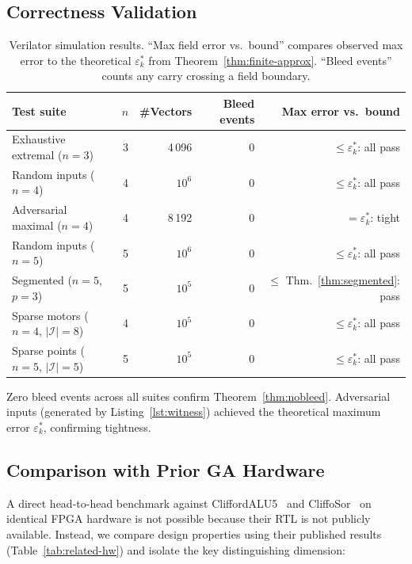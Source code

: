 \documentclass[11pt,a4paper]{article}
\theoremstyle{definition}
\theoremstyle{plain}
\theoremstyle{remark}
\begin{document}
\subsection{Correctness Validation}

\begin{table}[h]
\centering
\caption{Verilator simulation results.
``Max field error vs.\ bound'' compares observed max error to the
theoretical $\varepsilon_k^*$ from Theorem~\ref{thm:finite-approx}.
``Bleed events'' counts any carry crossing a field boundary.}
\label{tab:correctness}
\begin{tabular}{lrrrr}
\toprule
Test suite & $n$ & \#Vectors & Bleed events & Max error vs.\ bound \\
\midrule
Exhaustive extremal ($n=3$) & 3 & 4\,096 & 0 & $\le\varepsilon_k^*$: all pass \\
Random inputs ($n=4$) & 4 & $10^6$ & 0 & $\le\varepsilon_k^*$: all pass \\
Adversarial maximal ($n=4$) & 4 & 8\,192 & 0 & $=\varepsilon_k^*$: tight \\
Random inputs ($n=5$) & 5 & $10^6$ & 0 & $\le\varepsilon_k^*$: all pass \\
Segmented ($n=5$, $p=3$) & 5 & $10^5$ & 0 & $\le$ Thm.~\ref{thm:segmented}: pass \\
Sparse motors ($n=4$, $|\mathcal{I}|=8$) & 4 & $10^5$ & 0 & $\le\varepsilon_k^*$: all pass \\
Sparse points ($n=5$, $|\mathcal{I}|=5$) & 5 & $10^5$ & 0 & $\le\varepsilon_k^*$: all pass \\
\bottomrule
\end{tabular}
\end{table}

Zero bleed events across all suites confirm Theorem~\ref{thm:nobleed}.
Adversarial inputs (generated by Listing~\ref{lst:witness}) achieved
the theoretical maximum error $\varepsilon_k^*$, confirming tightness.

\subsection{Comparison with Prior GA Hardware}

A direct head-to-head benchmark against CliffordALU5~\cite{cliffordalu5}
and CliffoSor~\cite{cliffosor} on identical FPGA hardware is not
possible because their RTL is not publicly available.
Instead, we compare design properties using their published results
(Table~\ref{tab:related-hw}) and isolate the key distinguishing
dimension:
\end{document}
